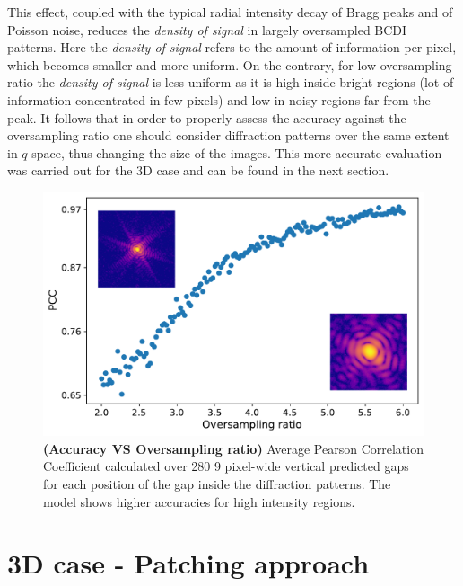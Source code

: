 This effect, coupled with the typical radial
intensity decay of Bragg peaks and of Poisson noise, reduces the \textit{density of signal} in largely oversampled BCDI 
patterns. Here the \textit{density of signal} refers to the amount of information per pixel, which becomes smaller and more uniform. 
On the contrary, for low oversampling ratio the \textit{density of signal} is less uniform as it is high inside bright 
regions (lot of information concentrated in few pixels) and low in noisy regions far from the peak. It follows that 
in order to properly assess the accuracy against the oversampling ratio one should consider diffraction patterns over 
the same extent in $q$-space, thus changing the size of the images. This more accurate evaluation was carried out for 
the 3D case and can be found in the next section.

\begin{figure}[h]
    \centering
    \includegraphics[width=.7\textwidth]{figures/Inpainting/2D_acc_ovs.pdf}
    \caption{\textbf{(Accuracy VS Oversampling ratio)} Average Pearson Correlation Coefficient calculated over 280
    9 pixel-wide vertical predicted gaps for each position of the gap inside the diffraction patterns. The model 
    shows higher accuracies for high intensity regions.}
    \label{fig:accVSovs}
\end{figure}

\section{3D case - Patching approach}\label{sec:patching}

